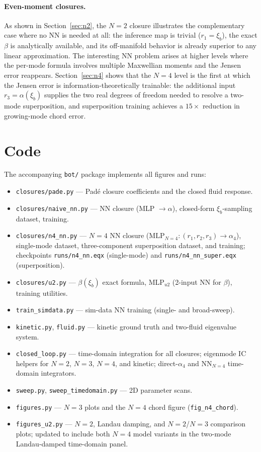 \documentclass[11pt]{article}
\newcommand{\xib}{\xi_b}
\begin{document}
\paragraph{Even-moment closures.}
As shown in Section~\ref{sec:n2}, the $N=2$ closure illustrates the
complementary case where no NN is needed at all: the inference map is
trivial ($r_1=\xib$), the exact $\beta$ is analytically available, and
its off-manifold behavior is already superior to any linear approximation.
The interesting NN problem arises at higher levels where the per-mode
formula involves multiple Maxwellian moments and the Jensen error reappears.
Section~\ref{sec:n4} shows that the $N=4$ level is the first at which the
Jensen error is information-theoretically trainable: the additional
input $r_3 = \alpha(\xib)$ supplies the two real degrees of freedom
needed to resolve a two-mode superposition, and superposition training
achieves a $15\times$ reduction in growing-mode chord error.

\section*{Code}

The accompanying \texttt{bot/} package implements all figures and runs:
\begin{itemize}\itemsep0pt
  \item \texttt{closures/pade.py} --- Pad\'e closure coefficients and the
    closed fluid response.
  \item \texttt{closures/naive\_nn.py} --- NN closure (MLP $\to \alpha$),
    closed-form $\xib$-sampling dataset, training.
  \item \texttt{closures/n4\_nn.py} --- $N=4$ NN closure
    ($\mathrm{MLP}_{N=4} : (r_1,r_2,r_3) \to \alpha_4$), single-mode
    dataset, three-component superposition dataset, and training;
    checkpoints \texttt{runs/n4\_nn.eqx} (single-mode) and
    \texttt{runs/n4\_nn\_super.eqx} (superposition).
  \item \texttt{closures/u2.py} --- $\beta(\xib)$ exact formula, MLP$_{u2}$
    (2-input NN for $\beta$), training utilities.
  \item \texttt{train\_simdata.py} --- sim-data NN training (single- and
    broad-sweep).
  \item \texttt{kinetic.py}, \texttt{fluid.py} --- kinetic ground truth and
    two-fluid eigenvalue system.
  \item \texttt{closed\_loop.py} --- time-domain integration for all
    closures; eigenmode IC helpers for $N=2$, $N=3$, $N=4$, and kinetic;
    direct-$\alpha_4$ and NN$_{N=4}$ time-domain integrators.
  \item \texttt{sweep.py}, \texttt{sweep\_timedomain.py} --- 2D parameter
    scans.
  \item \texttt{figures.py} --- $N=3$ plots and the $N=4$ chord figure
    (\texttt{fig\_n4\_chord}).
  \item \texttt{figures\_u2.py} --- $N=2$, Landau damping, and $N=2$/$N=3$
    comparison plots; updated to include both $N=4$ model variants in the
    two-mode Landau-damped time-domain panel.
\end{itemize}
\end{document}
